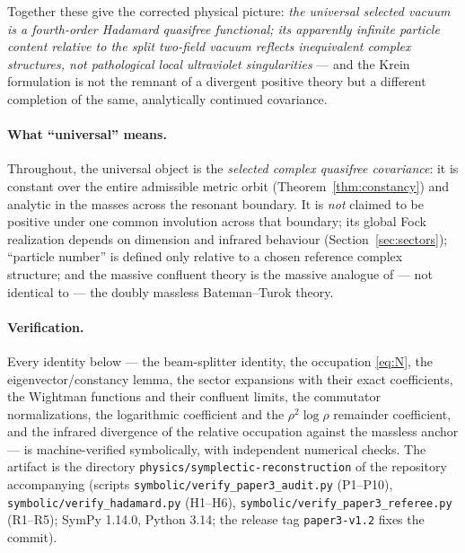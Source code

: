 \documentclass[11pt]{article}
\theoremstyle{definition}
\theoremstyle{remark}
\begin{document}
Together these give the corrected physical picture: \emph{the universal
selected vacuum is a fourth-order Hadamard quasifree functional; its
apparently infinite particle content relative to the split two-field
vacuum reflects inequivalent complex structures, not pathological local
ultraviolet singularities} --- and the Krein formulation is not the
remnant of a divergent positive theory but a different completion of the
same, analytically continued covariance.

\paragraph{What ``universal'' means.}
Throughout, the universal object is the \emph{selected complex quasifree
covariance}: it is constant over the entire admissible metric orbit
(Theorem~\ref{thm:constancy}) and analytic in the masses across the
resonant boundary.  It is \emph{not} claimed to be positive under one
common involution across that boundary; its global Fock realization
depends on dimension and infrared behaviour
(Section~\ref{sec:sectors}); ``particle number'' is defined only
relative to a chosen reference complex structure; and the massive
confluent theory is the massive analogue of --- not identical to --- the
doubly massless Bateman--Turok theory.

\paragraph{Verification.}
Every identity below --- the beam-splitter identity, the occupation
\eqref{eq:N}, the eigenvector/constancy lemma, the sector expansions with
their exact coefficients, the Wightman functions and their confluent
limits, the commutator normalizations, the logarithmic coefficient and
the $\rho^2\log\rho$ remainder coefficient, and the infrared divergence
of the relative occupation against the massless anchor ---
is machine-verified symbolically, with independent numerical checks.
The artifact is the directory \texttt{physics/symplectic-reconstruction}
of the repository accompanying \cite{companion1,companion2} (scripts
\texttt{symbolic/verify\_paper3\_audit.py} (P1--P10),
\texttt{symbolic/verify\_hadamard.py} (H1--H6),
\texttt{symbolic/verify\_paper3\_referee.py} (R1--R5); SymPy 1.14.0,
Python 3.14; the release tag \texttt{paper3-v1.2} fixes the commit).
\end{document}
